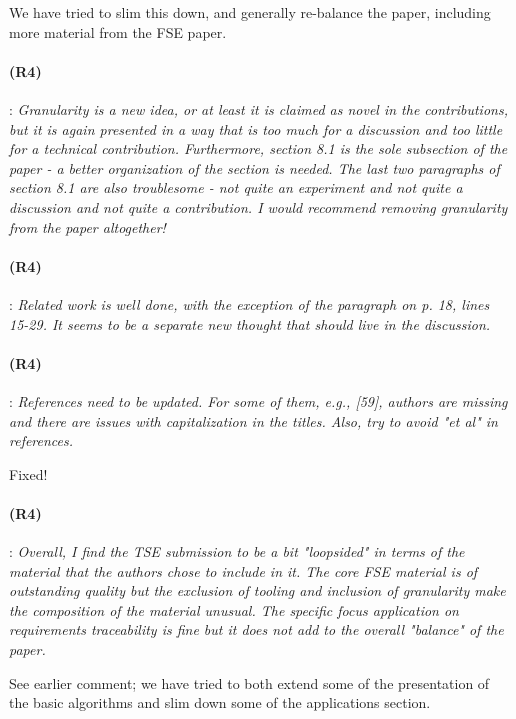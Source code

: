 \documentclass{article}
\begin{document}

We have tried to slim this down, and generally re-balance the paper, including more material from the FSE paper.

\paragraph{(R4)}: \textit{Granularity is a new idea, or at least it is claimed as novel in the contributions, but it is again presented in a way that is too much for a discussion and too little for a technical contribution. Furthermore, section 8.1 is the sole subsection of the paper - a better organization of the section is needed.  The last two paragraphs of section 8.1 are also troublesome - not quite an experiment and not quite a discussion and not quite a contribution.  I would recommend removing granularity from the paper altogether!}
\vspace{0.05in}


\paragraph{(R4)}: \textit{Related work is well done, with the exception of the paragraph on p. 18, lines 15-29. It seems to be a separate new thought that should live in the discussion.}
\vspace{0.05in}


\paragraph{(R4)}: \textit{References need to be updated. For some of them, e.g., [59], authors are missing and there are issues with capitalization in the titles. Also, try to avoid "et al" in references.}
\vspace{0.05in}

Fixed!

\paragraph{(R4)}: \textit{Overall, I find the TSE submission to be a bit "loopsided" in terms of the material that the authors chose to include in it. The core FSE material is of outstanding quality but the exclusion of tooling and inclusion of granularity make the composition of the material unusual. The specific focus application on requirements traceability is fine but it does not add to the overall "balance" of the paper.}
\vspace{0.05in}

See earlier comment; we have tried to both extend some of the presentation of the basic algorithms and slim down some of the applications section.
\end{document}
